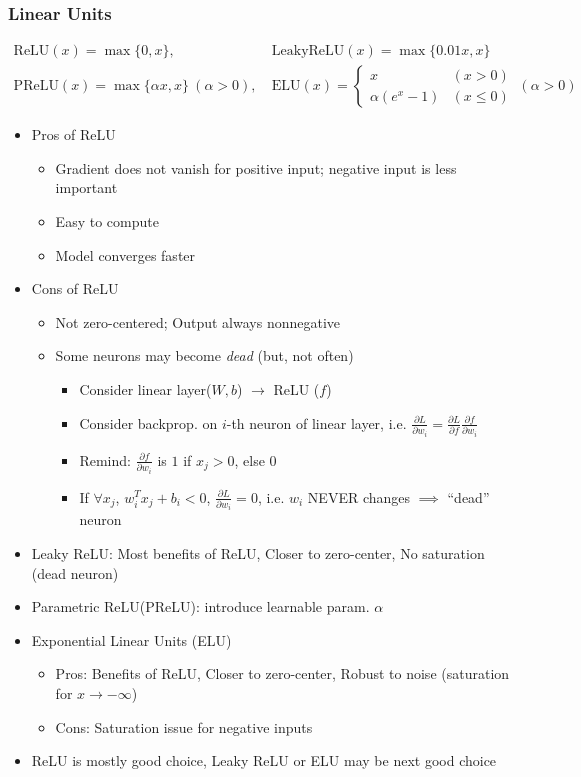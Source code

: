 \subsubsection*{Linear Units}
\begin{equation}\begin{aligned}
    \text{ReLU}(x)=\max\{0,x\},&~\text{LeakyReLU}(x)=\max\{0.01 x,x\}\\
    \text{PReLU}(x)=\max\{\alpha x,x\}~(\alpha>0),&~\text{ELU}(x)=\begin{cases}
        x & (x>0) \\
        \alpha(e^x-1) & (x\leq 0)
    \end{cases}~(\alpha>0)
\end{aligned}\end{equation}
\begin{itemize}
    \item Pros of ReLU
    \begin{itemize}
        \item Gradient does not vanish for positive input; negative input is less important
        \item Easy to compute
        \item Model converges faster
    \end{itemize}
    \item Cons of ReLU
    \begin{itemize}
        \item Not zero-centered; Output always nonnegative
        \item Some neurons may become \textit{dead} (but, not often)
        \begin{itemize}
            \item Consider linear layer($W,b$) $\to$ ReLU ($f$)
            \item Consider backprop. on $i$-th neuron of linear layer, i.e. $\frac{\partial L}{\partial w_i}=\frac{\partial L}{\partial f}\frac{\partial f}{\partial w_i}$
            \item Remind: $\frac{\partial f}{\partial w_i}$ is $1$ if $x_j>0$, else $0$
            \item If $\forall x_j$, $w_i^Tx_j+b_i<0$, $\frac{\partial L}{\partial w_i}=0$, i.e. $w_i$ NEVER changes $\implies$ ``dead'' neuron
        \end{itemize}
    \end{itemize}
    \item Leaky ReLU: Most benefits of ReLU, Closer to zero-center, No saturation (dead neuron)
    \item Parametric ReLU(PReLU): introduce learnable param. $\alpha$
    \item Exponential Linear Units (ELU)
    \begin{itemize}
        \item Pros: Benefits of ReLU, Closer to zero-center, Robust to noise (saturation for $x\to-\infty$)
        \item Cons: Saturation issue for negative inputs
    \end{itemize}
    \item ReLU is mostly good choice, Leaky ReLU or ELU may be next good choice
\end{itemize}
